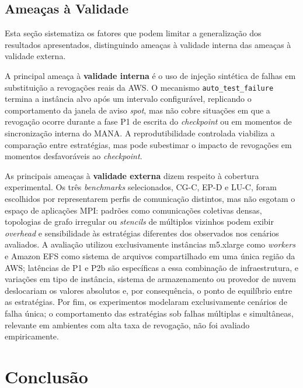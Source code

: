 \section{Ameaças à Validade}
\label{sec:ameacas-validade}

Esta seção sistematiza os fatores que podem limitar a generalização dos resultados
apresentados, distinguindo ameaças à validade interna das ameaças à validade externa.

A principal ameaça à \textbf{validade interna} é o uso de injeção sintética de
falhas em substituição a revogações reais da AWS. O mecanismo
\texttt{auto\_test\_failure} termina a instância alvo após um intervalo configurável,
replicando o comportamento da janela de aviso \textit{spot}, mas não cobre situações em
que a revogação ocorre durante a fase P1 de escrita do \textit{checkpoint} ou em
momentos de sincronização interna do MANA. A reprodutibilidade controlada viabiliza a
comparação entre estratégias, mas pode subestimar o impacto de revogações em momentos
desfavoráveis ao \textit{checkpoint}.

As principais ameaças à \textbf{validade externa} dizem respeito à cobertura
experimental. Os três \textit{benchmarks} selecionados, CG-C, EP-D e LU-C, foram
escolhidos por representarem perfis de comunicação distintos, mas não esgotam o espaço
de aplicações MPI: padrões como comunicações coletivas densas, topologias de grafo
irregular ou \textit{stencils} de múltiplos vizinhos podem exibir \textit{overhead} e
sensibilidade às estratégias diferentes dos observados nos cenários avaliados. A avaliação
utilizou exclusivamente instâncias m5.xlarge como \textit{workers} e Amazon EFS como
sistema de arquivos compartilhado em uma única região da AWS; latências de P1 e P2b são
específicas a essa combinação de infraestrutura, e variações em tipo de instância,
sistema de armazenamento ou provedor de nuvem deslocariam os valores absolutos e, por
consequência, o ponto de equilíbrio entre as estratégias. Por fim, os experimentos
modelaram exclusivamente cenários de falha única; o comportamento das estratégias sob
falhas múltiplas e simultâneas, relevante em ambientes com alta taxa de revogação,
não foi avaliado empiricamente.

\chapter{Conclusão}
\label{ch:conclusao}

